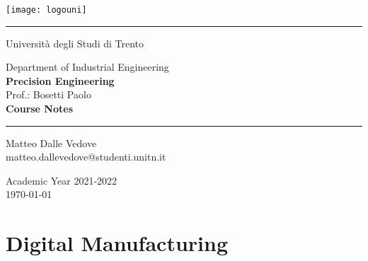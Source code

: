 \documentclass[10 pt,letterpaper,oneside,openright]{book}
\begin{document}
	
	\frontmatter
	
	\begin{center}
		\vspace{3cm}
		\thispagestyle{empty}
		\texttt{[image: logouni]}
		
		\vspace{1cm}
		\rule{5cm}{0.5pt}
		\vspace{1cm}		
		
		{\Large Università degli Studi di Trento}
		
		\vspace{2cm}
		{\Large Department of Industrial Engineering} \\ \vspace{2mm}
		{\LARGE \textbf{Precision Engineering}} \\ \vspace{2mm}
		{\Large Prof.: Bosetti Paolo}\\
		
		\vspace{2cm}
		{\LARGE \textbf{Course Notes}}
		
		\vspace{1cm}
		\rule{5cm}{0.5pt}
		\vspace{1cm}	
		
		{\large 
			Matteo Dalle Vedove \\
			\makeatletter
			matteo.dallevedove@studenti.unitn.it
			
			\vspace{2cm}
			Academic Year 2021-2022 \\ \today}
	\end{center}
	
	\tableofcontents
	
	\mainmatter	
	
%	
%	
%	
%	
	
	\part{Digital Manufacturing}
	
	
\end{document}
